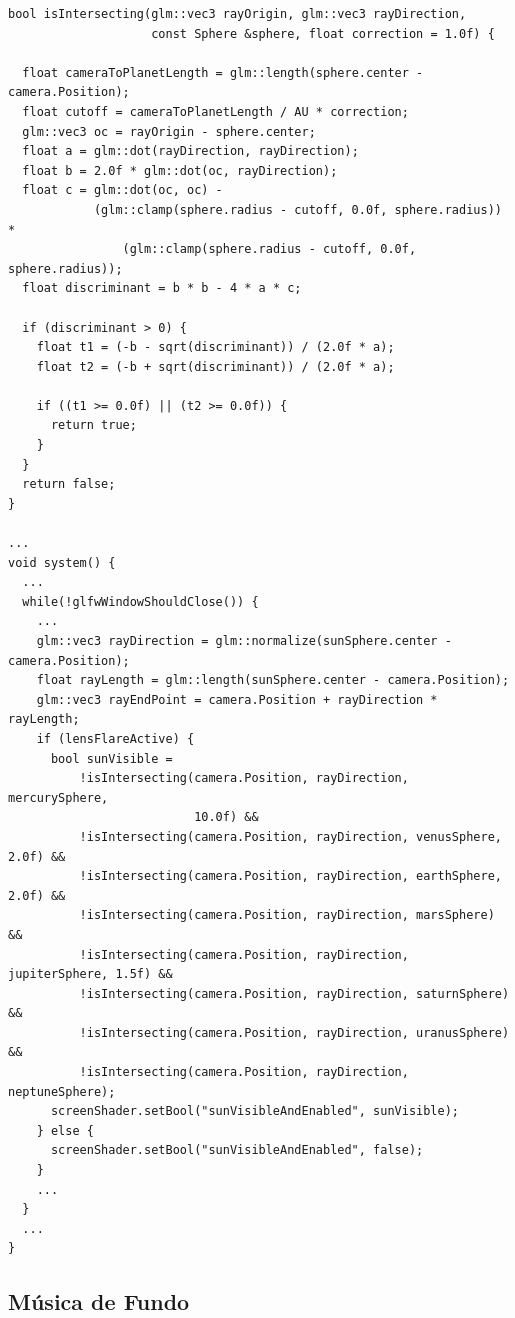 \begin{lstlisting}[style=Cpp, caption=Verificação da interseção do \textit{ray-cast}]
bool isIntersecting(glm::vec3 rayOrigin, glm::vec3 rayDirection,
                    const Sphere &sphere, float correction = 1.0f) {

  float cameraToPlanetLength = glm::length(sphere.center - camera.Position);
  float cutoff = cameraToPlanetLength / AU * correction;
  glm::vec3 oc = rayOrigin - sphere.center;
  float a = glm::dot(rayDirection, rayDirection);
  float b = 2.0f * glm::dot(oc, rayDirection);
  float c = glm::dot(oc, oc) -
            (glm::clamp(sphere.radius - cutoff, 0.0f, sphere.radius)) *
                (glm::clamp(sphere.radius - cutoff, 0.0f, sphere.radius));
  float discriminant = b * b - 4 * a * c;

  if (discriminant > 0) {
    float t1 = (-b - sqrt(discriminant)) / (2.0f * a);
    float t2 = (-b + sqrt(discriminant)) / (2.0f * a);

    if ((t1 >= 0.0f) || (t2 >= 0.0f)) {
      return true;
    }
  }
  return false;
}

...
void system() {
  ...
  while(!glfwWindowShouldClose()) {
    ...
    glm::vec3 rayDirection = glm::normalize(sunSphere.center - camera.Position);
    float rayLength = glm::length(sunSphere.center - camera.Position);
    glm::vec3 rayEndPoint = camera.Position + rayDirection * rayLength;
    if (lensFlareActive) {
      bool sunVisible =
          !isIntersecting(camera.Position, rayDirection, mercurySphere,
                          10.0f) &&
          !isIntersecting(camera.Position, rayDirection, venusSphere, 2.0f) &&
          !isIntersecting(camera.Position, rayDirection, earthSphere, 2.0f) &&
          !isIntersecting(camera.Position, rayDirection, marsSphere) &&
          !isIntersecting(camera.Position, rayDirection, jupiterSphere, 1.5f) &&
          !isIntersecting(camera.Position, rayDirection, saturnSphere) &&
          !isIntersecting(camera.Position, rayDirection, uranusSphere) &&
          !isIntersecting(camera.Position, rayDirection, neptuneSphere);
      screenShader.setBool("sunVisibleAndEnabled", sunVisible);
    } else {
      screenShader.setBool("sunVisibleAndEnabled", false);
    }
    ...
  }
  ...
}
\end{lstlisting}

\subsection{Música de Fundo}
\label{chap2:sec:musica}

